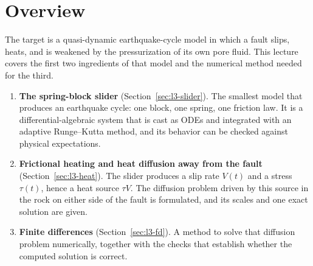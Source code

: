 \renewcommand{\thesection}{\arabic{section}}
\setcounter{section}{0}

\section{Overview}
\label{sec:l3-overview}

The target is a quasi-dynamic earthquake-cycle model in which a fault slips, heats, and is weakened by the pressurization of its own pore fluid. This lecture covers the first two ingredients of that model and the numerical method needed for the third.

\begin{enumerate}[itemsep=1pt,topsep=2pt]
\item \textbf{The spring-block slider} (Section~\ref{sec:l3-slider}). The smallest model that produces an earthquake cycle: one block, one spring, one friction law. It is a differential-algebraic system that is cast as ODEs and integrated with an adaptive Runge--Kutta method, and its behavior can be checked against physical expectations.
\item \textbf{Frictional heating and heat diffusion away from the fault} (Section~\ref{sec:l3-heat}). The slider produces a slip rate $V(t)$ and a stress $\tau(t)$, hence a heat source $\tau V$. The diffusion problem driven by this source in the rock on either side of the fault is formulated, and its scales and one exact solution are given.
\item \textbf{Finite differences} (Section~\ref{sec:l3-fd}). A method to solve that diffusion problem numerically, together with the checks that establish whether the computed solution is correct.
\end{enumerate}


